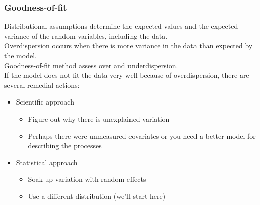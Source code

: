 \documentclass[color=usenames,dvipsnames]{beamer}\usepackage[]{graphicx}\usepackage[]{color}
\begin{document}
\begin{frame}
  \frametitle{Goodness-of-fit}
  \small
  Distributional assumptions determine the expected values
  \alert{and the expected variance} of the random variables, including
  the data. \\  
  \pause
  \vfill
  Overdispersion occurs when there is more variance in the data than
  expected by the model. \\
  \pause
  \vfill
  Goodness-of-fit method assess over and underdispersion. \\
  \pause
  \vfill
  If the model does not fit the data very well because of
  overdispersion, there are several remedial actions:
  \begin{itemize}
  \item<5-> Scientific approach
    \begin{itemize}
       \item Figure out why there is unexplained variation
       \item Perhaps there were unmeasured covariates or you need a
         better model for describing the processes
    \end{itemize}
  \item<6-> Statistical approach
    \begin{itemize}
      \item Soak up variation with random effects
      \item Use a different distribution (we'll start here)
    \end{itemize}
  \end{itemize}
\end{frame}
\end{document}
